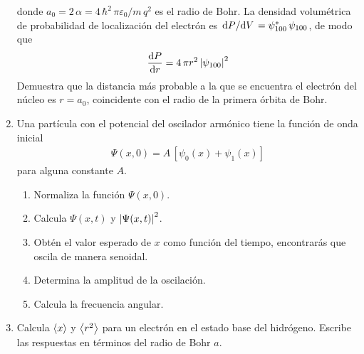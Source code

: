 \begin{enumerate}
donde $a_{0} = 2 \, \alpha = 4 \, \hbar^{2} \, \pi \varepsilon_{0}/ m \,q^{2}$ es el radio de Bohr. La densidad volumétrica de probabilidad de localización del electrón es $\dv*{P}{V} = \psi_{100}^{*} \, \psi_{100}$, de modo que 
\begin{align*}
\dv{P}{r} = 4 \, \pi r^{2} \, \abs{\psi_{100}}^{2}
\end{align*}
Demuestra que la distancia más probable a la que se encuentra el electrón del núcleo es $r = a_{0}$, coincidente con el radio de la primera órbita de Bohr.
\item Una partícula con el potencial del oscilador armónico tiene la función de onda inicial
\begin{align*}
\Psi (x, 0) = A \, [\psi_{0} (x) + \psi_{1} (x) ]
\end{align*}
para alguna constante $A$.
\begin{enumerate}
\item Normaliza la función $\Psi (x, 0)$.
\item Calcula $\Psi (x, t)$ y $\abs{\Psi (x, t)}^{2}$.
\item Obtén el valor esperado de $x$ como función del tiempo, encontrarás que oscila de manera senoidal. 
\item Determina la amplitud de la oscilación.
\item Calcula la frecuencia angular.
\end{enumerate}
\item Calcula $\expval{x}$ y $\expval{r^{2}}$ para un electrón en el estado base del hidrógeno. Escribe las respuestas en términos del radio de Bohr $a$.
\end{enumerate}
